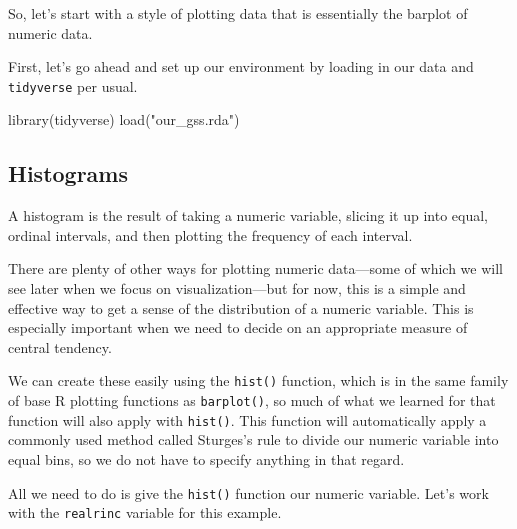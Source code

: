 \documentclass[
  letterpaper,
  DIV=11,
  numbers=noendperiod]{scrreprt}
\newenvironment{Shaded}{\begin{snugshade}}{\end{snugshade}}
\newcommand{\FunctionTok}[1]{\textcolor[rgb]{0.28,0.35,0.67}{#1}}
\newcommand{\NormalTok}[1]{\textcolor[rgb]{0.00,0.23,0.31}{#1}}
\newcommand{\SpecialCharTok}[1]{\textcolor[rgb]{0.37,0.37,0.37}{#1}}
\newcommand{\StringTok}[1]{\textcolor[rgb]{0.13,0.47,0.30}{#1}}
\begin{document}
So, let's start with a style of plotting data that is essentially the
barplot of numeric data.

First, let's go ahead and set up our environment by loading in our data
and \texttt{tidyverse} per usual.

\begin{Shaded}
\begin{Highlighting}[]
\FunctionTok{library}\NormalTok{(tidyverse)}
\FunctionTok{load}\NormalTok{(}\StringTok{"our\_gss.rda"}\NormalTok{)}
\end{Highlighting}
\end{Shaded}

\subsection{Histograms}\label{histograms}

A histogram is the result of taking a numeric variable, slicing it up
into equal, ordinal intervals, and then plotting the frequency of each
interval.

There are plenty of other ways for plotting numeric data---some of which
we will see later when we focus on visualization---but for now, this is
a simple and effective way to get a sense of the distribution of a
numeric variable. This is especially important when we need to decide on
an appropriate measure of central tendency.

We can create these easily using the \texttt{hist()} function, which is
in the same family of base R plotting functions as \texttt{barplot()},
so much of what we learned for that function will also apply with
\texttt{hist()}. This function will automatically apply a commonly used
method called Sturges's rule to divide our numeric variable into equal
bins, so we do not have to specify anything in that regard.

All we need to do is give the \texttt{hist()} function our numeric
variable. Let's work with the \texttt{realrinc} variable for this
example.

\begin{Shaded}
\end{Shaded}
\end{document}
